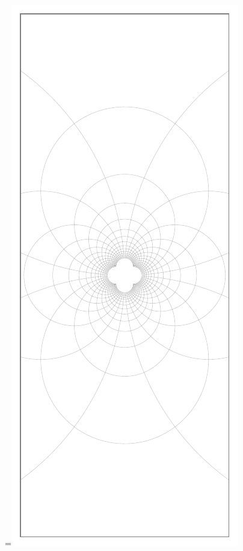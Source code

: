 \documentclass{report}
\begin{document}
\begin{titlepage}
	\begin{minipage}[t]{\dimexpr \textwidth-10cm-\columnsep}
		\maketitle
	 \end{minipage}
	\hfill
	\begingroup
{}=\hbox{\includegraphics{fig/sct.pdf}}%
\parbox{\wd0}{}\endgroup
\end{titlepage}
\end{document}
